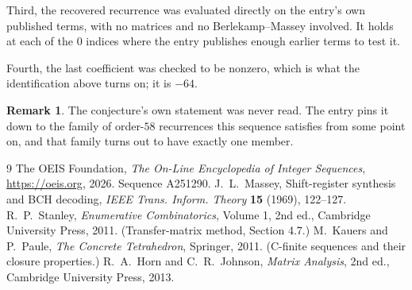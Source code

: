 \documentclass[11pt,a4paper]{article}
\theoremstyle{plain}
\theoremstyle{definition}
\newtheorem{remark}[theorem]{Remark}
\begin{document}
Third, the recovered recurrence was evaluated directly on the entry's own published terms, with
no matrices and no Berlekamp--Massey involved. It holds at each of the $0$ indices where
the entry publishes enough earlier terms to test it.

Fourth, the last coefficient was checked to be nonzero, which is what the identification above
turns on; it is $-64$.

\begin{remark}
The conjecture's own statement was never read. The entry pins it down to the family of
order-$58$ recurrences this sequence satisfies from some point on, and that family turns
out to have exactly one member.
\end{remark}

\begin{thebibliography}{9}
 The OEIS Foundation, \emph{The On-Line Encyclopedia of Integer
Sequences}, \url{https://oeis.org}, 2026. Sequence A251290.
 J.~L.~Massey, Shift-register synthesis and BCH decoding, \emph{IEEE
Trans. Inform. Theory} \textbf{15} (1969), 122--127.
 R.~P.~Stanley, \emph{Enumerative Combinatorics}, Volume 1, 2nd ed.,
Cambridge University Press, 2011. (Transfer-matrix method, Section 4.7.)
 M.~Kauers and P.~Paule, \emph{The Concrete Tetrahedron}, Springer, 2011.
(C-finite sequences and their closure properties.)
 R.~A.~Horn and C.~R.~Johnson, \emph{Matrix Analysis}, 2nd ed., Cambridge
University Press, 2013.
\end{thebibliography}
\end{document}
